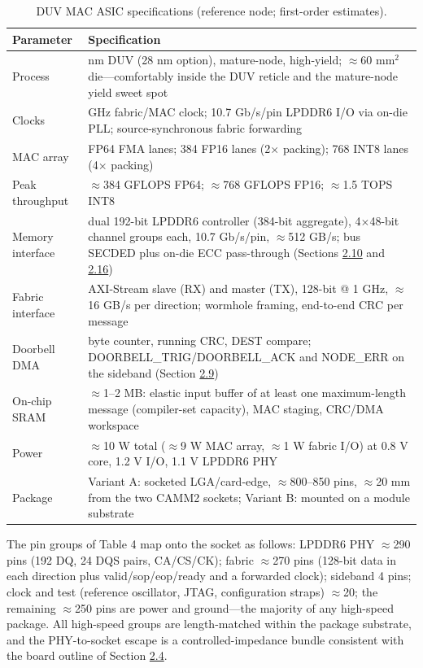 \documentclass[12pt,onecolumn]{article}
\begin{document}
\begin{table}[t]
\centering
\footnotesize
\caption{DUV MAC ASIC specifications (reference node; first-order estimates).}\label{tab:4}
\begin{tabularx}{\columnwidth}{>{\hsize=0.4000\hsize}X>{\hsize=1.6000\hsize}X}
\toprule
Parameter & Specification \\
\midrule
Process & 14 nm DUV (28 nm option), mature-node, high-yield; $\approx$60 mm$^2$ die---comfortably inside the DUV reticle and the mature-node yield sweet spot \\
Clocks & 1 GHz fabric/MAC clock; 10.7 Gb/s/pin LPDDR6 I/O via on-die PLL; source-synchronous fabric forwarding \\
MAC array & 192 FP64 FMA lanes; 384 FP16 lanes (2$\times$ packing); 768 INT8 lanes (4$\times$ packing) \\
Peak throughput & $\approx$384 GFLOPS FP64; $\approx$768 GFLOPS FP16; $\approx$1.5 TOPS INT8 \\
Memory interface & dual 192-bit LPDDR6 controller (384-bit aggregate), 4$\times$48-bit channel groups each, 10.7 Gb/s/pin, $\approx$512 GB/s; bus SECDED plus on-die ECC pass-through (Sections \hyperref[sec:2.10]{2.10} and \hyperref[sec:2.16]{2.16}) \\
Fabric interface & AXI-Stream slave (RX) and master (TX), 128-bit @ 1 GHz, $\approx$16 GB/s per direction; wormhole framing, end-to-end CRC per message \\
Doorbell DMA & byte counter, running CRC, DEST compare; DOORBELL\_TRIG/DOORBELL\_ACK and NODE\_ERR on the sideband (Section \hyperref[sec:2.9]{2.9}) \\
On-chip SRAM & $\approx$1--2 MB: elastic input buffer of at least one maximum-length message (compiler-set capacity), MAC staging, CRC/DMA workspace \\
Power & $\approx$10 W total ($\approx$9 W MAC array, $\approx$1 W fabric I/O) at 0.8 V core, 1.2 V I/O, 1.1 V LPDDR6 PHY \\
Package & Variant A: socketed LGA/card-edge, $\approx$800--850 pins, $\approx$20 mm from the two CAMM2 sockets; Variant B: mounted on a module substrate \\
\bottomrule
\end{tabularx}
\end{table}


The pin groups of Table 4 map onto the socket as follows: LPDDR6 PHY $\approx$290 pins (192 DQ, 24 DQS pairs, CA/CS/CK); fabric $\approx$270 pins (128-bit data in each direction plus valid/sop/eop/ready and a forwarded clock); sideband 4 pins; clock and test (reference oscillator, JTAG, configuration straps) $\approx$20; the remaining $\approx$250 pins are power and ground---the majority of any high-speed package. All high-speed groups are length-matched within the package substrate, and the PHY-to-socket escape is a controlled-impedance bundle consistent with the board outline of Section \hyperref[sec:2.4]{2.4}.
\end{document}
